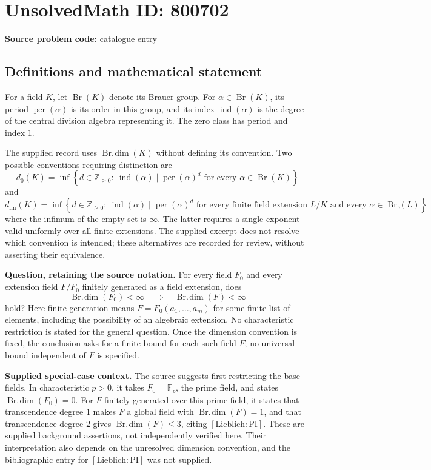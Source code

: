 \documentclass[11pt]{article}
\newcommand{\Z}{\mathbb{Z}}
\newcommand{\F}{\mathbb{F}}
\begin{document}
\section*{UnsolvedMath ID: 800702}
\textbf{Source problem code:} catalogue entry
\subsection{Definitions and mathematical statement}
For a field \(K\), let \(\operatorname{Br}(K)\) denote its Brauer group. For \(\alpha\in\operatorname{Br}(K)\), its period \(\operatorname{per}(\alpha)\) is its order in this group, and its index \(\operatorname{ind}(\alpha)\) is the degree of the central division algebra representing it. The zero class has period and index \(1\).

The supplied record uses \(\operatorname{Br.\!dim}(K)\) without defining its convention. Two possible conventions requiring distinction are
\[
 d_0(K)=\inf\left\{d\in\Z_{\ge0}:\ \operatorname{ind}(\alpha)\mid\operatorname{per}(\alpha)^d\text{ for every }\alpha\in\operatorname{Br}(K)\right\}
\]
and
\[
 d_{\mathrm{fin}}(K)=\inf\left\{d\in\Z_{\ge0}:\ \operatorname{ind}(\alpha)\mid\operatorname{per}(\alpha)^d\text{ for every finite field extension }L/K\text{ and every }\alpha\in\operatorname{Br}(L)\right\},
\]
where the infimum of the empty set is \(\infty\). The latter requires a single exponent valid uniformly over all finite extensions. The supplied excerpt does not resolve which convention is intended; these alternatives are recorded for review, without asserting their equivalence.

\textbf{Question, retaining the source notation.} For every field \(F_0\) and every extension field \(F/F_0\) finitely generated as a field extension, does
\[
 \operatorname{Br.\!dim}(F_0)<\infty
 \quad\Longrightarrow\quad
 \operatorname{Br.\!dim}(F)<\infty
\]
hold? Here finite generation means \(F=F_0(a_1,\ldots,a_m)\) for some finite list of elements, including the possibility of an algebraic extension. No characteristic restriction is stated for the general question. Once the dimension convention is fixed, the conclusion asks for a finite bound for each such field \(F\); no universal bound independent of \(F\) is specified.

\textbf{Supplied special-case context.} The source suggests first restricting the base fields. In characteristic \(p>0\), it takes \(F_0=\F_p\), the prime field, and states \(\operatorname{Br.\!dim}(F_0)=0\). For \(F\) finitely generated over this prime field, it states that transcendence degree \(1\) makes \(F\) a global field with \(\operatorname{Br.\!dim}(F)=1\), and that transcendence degree \(2\) gives \(\operatorname{Br.\!dim}(F)\le3\), citing \([\mathrm{Lieblich:PI}]\). These are supplied background assertions, not independently verified here. Their interpretation also depends on the unresolved dimension convention, and the bibliographic entry for \([\mathrm{Lieblich:PI}]\) was not supplied.
\end{document}

